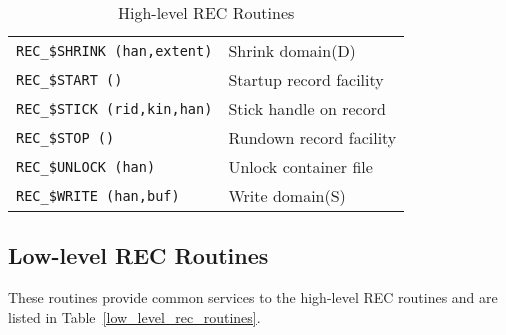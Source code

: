 \begin {table}[htbp]
\begin {center}
\begin {tabular}{||l|l||}
{\tt REC\_\$SHRINK (han,extent)}& Shrink domain(D) \\
{\tt REC\_\$START ()}		& Startup record facility \\
{\tt REC\_\$STICK (rid,kin,han)} & Stick handle on record \\
{\tt REC\_\$STOP ()}		& Rundown record facility \\
{\tt REC\_\$UNLOCK (han)}	& Unlock container file \\
{\tt REC\_\$WRITE (han,buf)}	& Write domain(S) \\
\hline
\end {tabular}
\caption {High-level REC Routines}
\label {high_level_rec_routines}
\end {center}
\end {table}

\subsection {Low-level REC Routines}

These routines provide common services to the
high-level REC routines and are listed in Table~\ref{low_level_rec_routines}.

